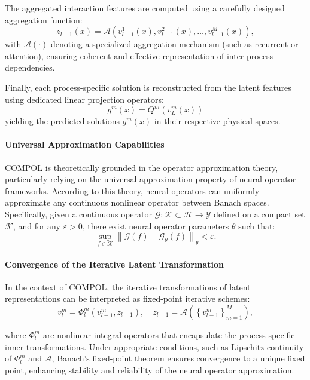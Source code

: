 The aggregated interaction features are computed using a carefully designed aggregation function:
\[
	z_{l-1}(x)=\mathcal{A}\left(v_{l-1}^1(x), v_{l-1}^2(x), \ldots, v_{l-1}^M(x)\right),
\]
with $\mathcal{A}(\cdot)$ denoting a specialized aggregation mechanism (such as recurrent or attention), ensuring coherent and effective representation of inter-process dependencies.

Finally, each process-specific solution is reconstructed from the latent features using dedicated linear projection operators:
\[
g^m(x)=Q^m\left(v_L^m(x)\right)
\]
yielding the predicted solutions $g^m(x)$ in their respective physical spaces.
\paragraph{Universal Approximation Capabilities} COMPOL is theoretically grounded in the operator approximation theory, particularly relying on the universal approximation property of neural operator frameworks. According to this theory, neural operators can uniformly approximate any continuous nonlinear operator between Banach spaces. Specifically, given a continuous operator $\mathcal{G}: \mathcal{K}\subset\mathcal{H}\rightarrow\mathcal{Y}$ defined on a compact set $\mathcal{K}$, and for any $\varepsilon>0$, there exist neural operator parameters $\theta$ such that:
\[
	\sup _{f \in \mathcal{K}}\left\|\mathcal{G}(f)-\mathcal{G}_\theta(f)\right\|_y<\varepsilon .
\]
\paragraph{Convergence of the Iterative Latent Transformation} In the context of COMPOL, the iterative transformations of latent representations can be interpreted as fixed-point iterative schemes:
\[
	v_l^m=\Phi_l^m\left(v_{l-1}^m, z_{l-1}\right), \quad z_{l-1}=\mathcal{A}\left(\left\{v_{l-1}^m\right\}_{m=1}^M\right),
\]

where $\Phi_l^m$ are nonlinear integral operators that encapsulate the process-specific inner transformations. Under appropriate conditions, such as Lipschitz continuity of $\Phi_l^m$ and $\mathcal{A}$, Banach’s fixed-point theorem ensures convergence to a unique fixed point, enhancing stability and reliability of the neural operator approximation.
